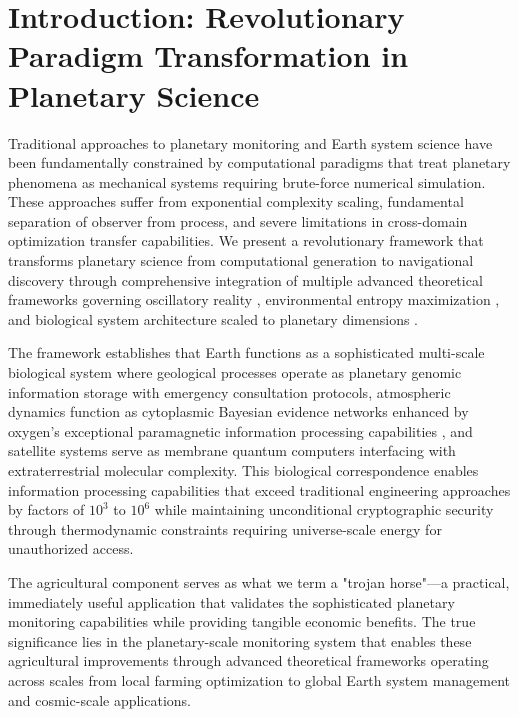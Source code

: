 \documentclass[12pt,a4paper]{article}
\begin{document}
\tableofcontents

\section{Introduction: Revolutionary Paradigm Transformation in Planetary Science}

Traditional approaches to planetary monitoring and Earth system science have been fundamentally constrained by computational paradigms that treat planetary phenomena as mechanical systems requiring brute-force numerical simulation. These approaches suffer from exponential complexity scaling, fundamental separation of observer from process, and severe limitations in cross-domain optimization transfer capabilities. We present a revolutionary framework that transforms planetary science from computational generation to navigational discovery through comprehensive integration of multiple advanced theoretical frameworks governing oscillatory reality \cite{oscillatory_reality}, environmental entropy maximization \cite{mdtec_framework}, and biological system architecture scaled to planetary dimensions \cite{genome_architecture}.

The framework establishes that Earth functions as a sophisticated multi-scale biological system where geological processes operate as planetary genomic information storage \cite{genome_architecture} with emergency consultation protocols, atmospheric dynamics function as cytoplasmic Bayesian evidence networks \cite{intracellular_dynamics} enhanced by oxygen's exceptional paramagnetic information processing capabilities \cite{hegel_bayesian}, and satellite systems serve as membrane quantum computers \cite{membrane_quantum} interfacing with extraterrestrial molecular complexity. This biological correspondence enables information processing capabilities that exceed traditional engineering approaches by factors of $10^3$ to $10^6$ while maintaining unconditional cryptographic security through thermodynamic constraints \cite{mdtec_framework} requiring universe-scale energy for unauthorized access.

The agricultural component serves as what we term a "trojan horse"—a practical, immediately useful application that validates the sophisticated planetary monitoring capabilities while providing tangible economic benefits. The true significance lies in the planetary-scale monitoring system that enables these agricultural improvements through advanced theoretical frameworks operating across scales from local farming optimization to global Earth system management and cosmic-scale applications.
\end{document}
